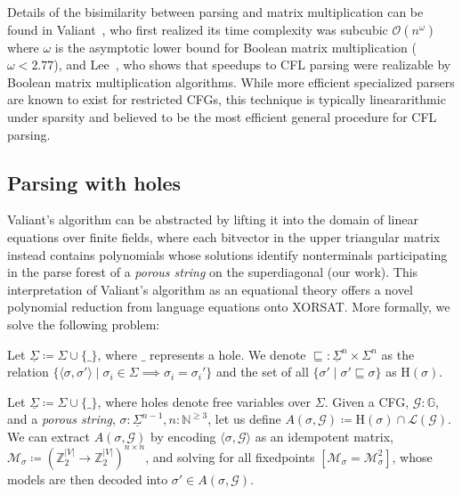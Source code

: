 \documentclass[sigplan,review,anonymous,acmsmall]{acmart}\settopmatter{printfolios=false,printccs=false,printacmref=false}
\begin{document}
Details of the bisimilarity between parsing and matrix multiplication can be found in Valiant~\cite{valiant1975general}, who first realized its time complexity was subcubic $\mathcal{O}(n^\omega)$ where $\omega$ is the asymptotic lower bound for Boolean matrix multiplication ($\omega < 2.77$), and Lee~\cite{lee2002fast}, who shows that speedups to CFL parsing were realizable by Boolean matrix multiplication algorithms. While more efficient specialized parsers are known to exist for restricted CFGs, this technique is typically lineararithmic under sparsity and believed to be the most efficient general procedure for CFL parsing.

\subsection{Parsing with holes}

Valiant's algorithm can be abstracted by lifting it into the domain of linear equations over finite fields, where each bitvector in the upper triangular matrix instead contains polynomials whose solutions identify nonterminals participating in the parse forest of a \textit{porous string} on the superdiagonal (our work). This interpretation of Valiant's algorithm as an equational theory offers a novel polynomial reduction from language equations onto XORSAT. More formally, we solve the following problem:%

\begin{definition}
  Let $\underline\Sigma \coloneqq \Sigma \cup \{\_\}$, where $\_$ represents a hole. We denote $\sqsubseteq: \underline\Sigma^n \times \Sigma^n$ as the relation $\{\langle\sigma, \sigma'\rangle \mid \sigma_i \in \Sigma \implies \sigma_i = \sigma_i'\}$ and the set of all $\{\sigma' \mid \sigma' \sqsubseteq \sigma\}$ as $\text{H}(\sigma)$.
\end{definition}

\begin{definition}
Let $\underline\Sigma \coloneq \Sigma \cup \{\_\}$, where holes denote free variables over $\Sigma$. Given a CFG, $\mathcal{G}: \mathbb{G}$, and a \textit{porous string}, $\sigma: \underline\Sigma^{n-1}, n: \mathbb{N}^{\geq 3}$, let us define $A(\sigma, \mathcal{G})\coloneqq\text{H}(\sigma)\cap\mathcal{L}(\mathcal{G})$. We can extract $A(\sigma, \mathcal{G})$ by encoding $\langle\sigma, \mathcal{G}\rangle$ as an idempotent matrix, $\mathcal{M}_\sigma\coloneqq (\mathbb{Z}_2^{|V|}\rightarrow\mathbb{Z}_2^{|V|})^{n \times n}$, and solving for all fixedpoints $[\mathcal{M}_\sigma = \mathcal{M}_\sigma^2]$, whose models are then decoded into $\sigma' \in A(\sigma, \mathcal{G})$.
\end{definition}
\end{document}
